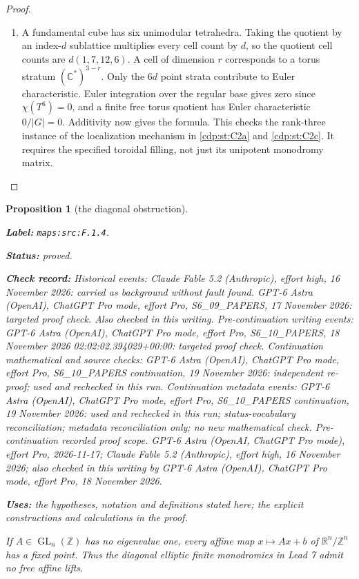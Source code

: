 \documentclass[11pt,a4paper]{article}
\newtheorem{proposition}[proposition]{Proposition}
\theoremstyle{definition}
\newcommand{\StatementRecord}[4]{\par\smallskip\begingroup\upshape\raggedright\noindent\textbf{Label:} \nolinkurl{#1}.\par\noindent\textbf{Status:} #2.\par\noindent\textbf{Check record:} #3.\par\noindent\textbf{Uses:} #4.\par\endgroup\smallskip}
\begin{document}
\begin{proof}
\begin{enumerate}[label=\arabic*.]
\item A fundamental cube has six unimodular tetrahedra.  Taking the
quotient by an index-$d$ sublattice multiplies every cell count
by $d$, so the quotient cell counts are $d(1,7,12,6)$.
A cell of dimension $r$ corresponds to a torus stratum
$(\mathbb C^*)^{3-r}$.  Only the $6d$ point strata contribute
to Euler characteristic.  Euler integration over the regular
base gives zero since $\chi(T^6)=0$, and a finite free torus
quotient has Euler characteristic $0/|G|=0$.  Additivity now
gives the formula.  This checks the rank-three instance of the
localization mechanism in \cref{cdp:st:C2a} and \cref{cdp:st:C2c}.  It requires the specified
toroidal filling, not just its unipotent monodromy matrix.

\end{enumerate}
\end{proof}




\begin{proposition}[the diagonal obstruction]\label{maps:src:F.1.4}
\StatementRecord{maps:src:F.1.4}{proved}{Historical events: Claude Fable 5.2 (Anthropic), effort high, 16 November 2026: carried as background without fault found. GPT-6 Astra (OpenAI), ChatGPT Pro mode, effort Pro, S6\_09\_PAPERS, 17 November 2026: targeted proof check. Also checked in this writing. Pre-continuation writing events: GPT-6 Astra (OpenAI), ChatGPT Pro mode, effort Pro, S6\_10\_PAPERS, 18 November 2026 02:02:02.394029+00:00: targeted proof check. Continuation mathematical and source checks: GPT-6 Astra (OpenAI), ChatGPT Pro mode, effort Pro, S6\_10\_PAPERS continuation, 19 November 2026: independent re-proof; used and rechecked in this run. Continuation metadata events: GPT-6 Astra (OpenAI), ChatGPT Pro mode, effort Pro, S6\_10\_PAPERS continuation, 19 November 2026: used and rechecked in this run; status-vocabulary reconciliation; metadata reconciliation only; no new mathematical check. \emph{Pre-continuation recorded proof scope.} GPT-6 Astra (OpenAI, ChatGPT Pro mode), effort Pro, 2026-11-17; Claude Fable 5.2 (Anthropic), effort high, 16 November 2026; also checked in this writing by GPT-6 Astra (OpenAI), ChatGPT Pro mode, effort Pro, 18 November 2026}{the hypotheses, notation and definitions stated here; the explicit constructions and calculations in the proof}


If $A\in\operatorname{GL}_n(\mathbb Z)$ has no eigenvalue one,
every affine map $x\mapsto Ax+b$ of $\mathbb R^n/\mathbb Z^n$
has a fixed point.  Thus the diagonal elliptic finite monodromies
in Lead 7 admit no free affine lifts.

\end{proposition}
\end{document}
